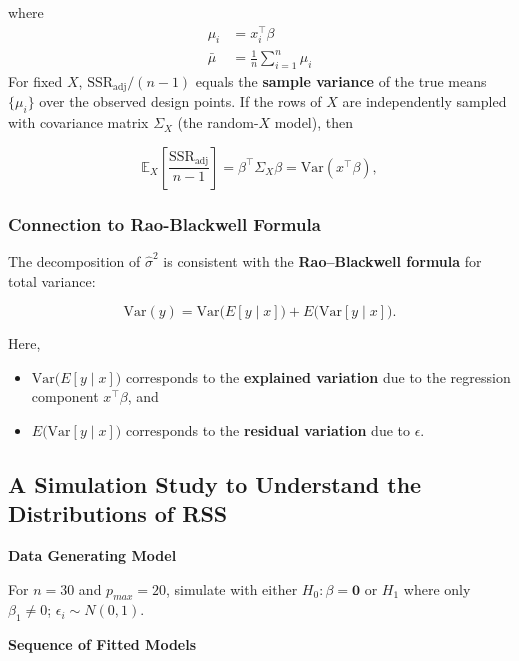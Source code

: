 \documentclass[
  letterpaper,
]{scrbook}
\providecommand{\tightlist}{%
  \setlength{\itemsep}{0pt}\setlength{\parskip}{0pt}}\usepackage{longtable,booktabs,array}
\begin{document}
where \[
\begin{aligned}
\mu_i &= x_i^\top \beta \\
\bar\mu &= \tfrac{1}{n}\sum_{i=1}^n \mu_i
\end{aligned}
\] For fixed \(X\), \(\mathrm{SSR}_{\text{adj}}/(n-1)\) equals the
\textbf{sample variance} of the true means \(\{\mu_i\}\) over the
observed design points. If the rows of \(X\) are independently sampled
with covariance matrix \(\Sigma_X\) (the random-\(X\) model), then

\[
\mathbb{E}_X\!\left[\frac{\mathrm{SSR}_{\text{adj}}}{n-1}\right]
= \beta^\top \Sigma_X \beta
= \mathrm{Var}(x^\top \beta),
\]

\subsubsection{Connection to Rao-Blackwell
Formula}\label{connection-to-rao-blackwell-formula}

The decomposition of \(\hat{\sigma}^2\) is consistent with the
\textbf{Rao--Blackwell formula} for total variance:

\[
\mathrm{Var}(y) = \mathrm{Var}\!\big(E[y \mid x]\big) + E\!\big(\mathrm{Var}[y \mid x]\big).
\]

Here,

\begin{itemize}
\tightlist
\item
  \(\mathrm{Var}\!\big(E[y \mid x]\big)\) corresponds to the
  \textbf{explained variation} due to the regression component
  \(x^\top\beta\), and\\
\item
  \(E\!\big(\mathrm{Var}[y \mid x]\big)\) corresponds to the
  \textbf{residual variation} due to \(\epsilon\).
\end{itemize}

\subsection{A Simulation Study to Understand the Distributions of
RSS}\label{a-simulation-study-to-understand-the-distributions-of-rss}

\textbf{Data Generating Model}

For \(n=30\) and \(p_{max}=20\), simulate with either
\(H_0:\beta=\mathbf 0\) or \(H_1\) where only \(\beta_1\neq 0\);
\(\epsilon_i\sim N(0,1)\).

\textbf{Sequence of Fitted Models}
\end{document}
